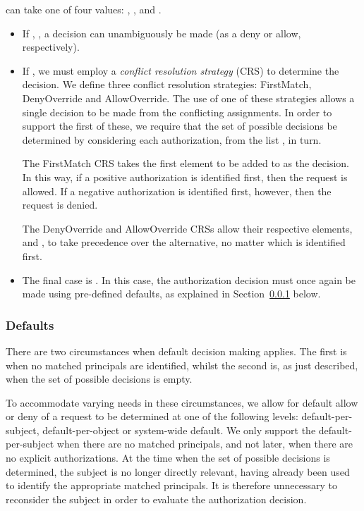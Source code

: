 \documentclass{article}
\begin{document}
 can take one of four values: , ,  and .
\begin{itemize}
  \item If , , a decision can unambiguously be made (as a deny or allow, respectively).
\item If , we must employ a \emph{conflict resolution strategy} (CRS) to determine the decision.
	We define three conflict resolution strategies: \textsf{FirstMatch}, \textsf{DenyOverride} and \textsf{AllowOverride}.
    The use of one of these strategies allows a single decision to be made from the conflicting assignments.
	In order to support the first of these, we require that the set of possible decisions be determined by considering each authorization, from the list , in turn.
	
	The \textsf{FirstMatch} CRS takes the first element to be added to  as the decision.
	In this way, if a positive authorization is identified first, then the request is allowed.
	If a negative authorization is identified first, however, then the request is denied.
	
	The \textsf{DenyOverride} and \textsf{AllowOverride} CRSs allow their respective elements,  and , to take precedence over the alternative, no matter which is identified first.
  \item The final case is . In this case, the authorization decision must once again be made using pre-defined defaults, as explained in Section~\ref{sec:AuthZModel:ReqEval:Defaults} below.
\end{itemize}


\subsubsection{Defaults}\label{sec:AuthZModel:ReqEval:Defaults}
There are two circumstances when default decision making applies. The first is when no matched principals are identified, whilst the second is, as just described, when the set of possible decisions is empty.

To accommodate varying needs in these circumstances, we allow for default allow or deny of a request to be determined at one of the following levels: default-per-subject, default-per-object or system-wide default. We only support the default-per-subject when there are no matched principals, and not later, when there are no explicit authorizations. At the time when the set of possible decisions is determined, the subject is no longer directly relevant, having already been used to identify the appropriate matched principals. It is therefore unnecessary to reconsider the subject in order to evaluate the authorization decision.
\end{document}
